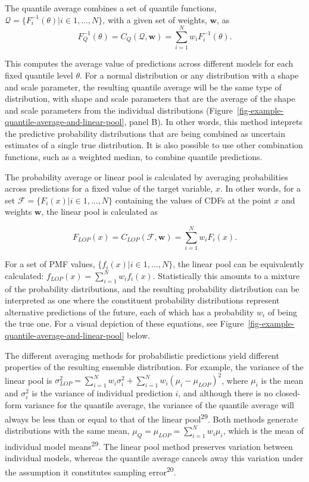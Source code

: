 \documentclass[
  letterpaper,
  DIV=11,
  numbers=noendperiod]{scrartcl}
\begin{document}
The quantile average combines a set of quantile functions,
\(\mathcal{Q} = \{F_i^{-1}(\theta)| i \in 1,...,N \}\), with a given set
of weights, \(\pmb{w}\), as \[
F^{-1}_Q(\theta) = C_Q(\mathcal{Q}, \pmb{w}) = \sum_{i = 1}^Nw_iF^{-1}_i(\theta).
\]

This computes the average value of predictions across different models
for each fixed quantile level \(\theta\). For a normal distribution or
any distribution with a shape and scale parameter, the resulting
quantile average will be the same type of distribution, with shape and
scale parameters that are the average of the shape and scale parameters
from the individual distributions
(Figure~\ref{fig-example-quantile-average-and-linear-pool}, panel B). In
other words, this method inteprets the predictive probability
distributions that are being combined as uncertain estimates of a single
true distribution. It is also possible to use other combination
functions, such as a weighted median, to combine quantile predictions.

The probability average or linear pool is calculated by averaging
probabilities across predictions for a fixed value of the target
variable, \(x\). In other words, for a set
\(\mathcal{F} = \{F_i(x)| i \in 1,...,N \}\) containing the values of
CDFs at the point \(x\) and weights \(\pmb{w}\), the linear pool is
calculated as

\[
F_{LOP}(x) = C_{LOP}(\mathcal{F}, \pmb{w}) = \sum_{i = 1}^Nw_iF_i(x). 
\]

For a set of PMF values, \(\{f_i(x)|i \in 1, ..., N\}\), the linear pool
can be equivalently calculated:
\(f_{LOP}(x) = \sum_{i = 1}^N w_i f_i(x)\). Statistically this amounts
to a mixture of the probability distributions, and the resulting
probability distribution can be interpreted as one where the constituent
probability distributions represent alternative predictions of the
future, each of which has a probability \(w_i\) of being the true one.
For a visual depiction of these equations, see
Figure~\ref{fig-example-quantile-average-and-linear-pool} below.

The different averaging methods for probabilistic predictions yield
different properties of the resulting ensemble distribution. For
example, the variance of the linear pool is
\(\sigma^2_{LOP} = \sum_{i=1}^Nw_i\sigma_i^2 + \sum_{i=1}^Nw_i(\mu_i-\mu_{LOP})^2\),
where \(\mu_i\) is the mean and \(\sigma^2_i\) is the variance of
individual prediction \(i\), and although there is no closed-form
variance for the quantile average, the variance of the quantile average
will always be less than or equal to that of the linear
pool\textsuperscript{29}. Both methods generate distributions with the
same mean, \(\mu_Q = \mu_{LOP} = \sum_{i=1}^Nw_i\mu_i\), which is the
mean of individual model means\textsuperscript{29}. The linear pool
method preserves variation between individual models, whereas the
quantile average cancels away this variation under the assumption it
constitutes sampling error\textsuperscript{20}.
\end{document}
